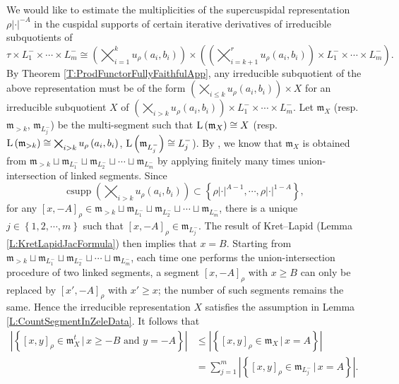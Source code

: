 \documentclass[11pt,letterpaper]{amsart}
\theoremstyle{plain}
\numberwithin{theorem}{section}
\numberwithin{equation}{subsection}
\theoremstyle{remark}
\newcommand{\csupp}{\operatorname{csupp}} %
\begin{document}
We would like to estimate the multiplicities of the supercuspidal representation $\rho|\cdot|^{-A}$ in the cuspidal supports of certain iterative derivatives of irreducible subquotients of
\[
    \tau\times L^-_1\times\cdots\times L^-_m\cong \left(\bigtimes_{i=1}^k u_\rho\left(a_i,b_i\right)\right) \times \left(\left(\bigtimes_{i=k+1}^r u_\rho\left(a_i,b_i\right)\right)\times L^-_1\times\cdots\times L^-_m\right).
\]
By Theorem \ref{T:ProdFunctorFullyFaithfulApp}, any irreducible subquotient of the above representation must be of the form $\left(\bigtimes_{i\leq k} u_\rho\left(a_i,b_i\right)\right)\times X$ for an irreducible subquotient $X$ of $\left(\bigtimes_{i>k} u_\rho\left(a_i,b_i\right)\right)\times L^-_1\times\cdots\times L^-_m$. Let $\mathfrak{m}_X$ (resp. $\mathfrak{m}_{>k}$, $\mathfrak{m}_{L^-_j}$) be the multi-segment such that ${\rm L}\left(\mathfrak{m}_X\right)\cong X$ (resp. ${\rm L}\left(\mathfrak{m}_{>k}\right)\cong \bigtimes_{i>k} u_\rho\left(a_i,b_i\right)$, ${\rm L}\left(\mathfrak{m}_{L^-_j}\right)\cong L^-_j$). By \cite[Thm. 7.1]{ZeleII}, we know that $\mathfrak{m}_X$ is obtained from $\mathfrak{m}_{>k}\sqcup\mathfrak{m}_{L^-_1}\sqcup\mathfrak{m}_{L^-_2}\sqcup\cdots\sqcup\mathfrak{m}_{L^-_m}$ by applying finitely many times union-intersection of linked segments. Since
\[
    \csupp\left(\bigtimes_{i>k} u_\rho\left(a_i,b_i\right)\right)\subset\left\{\rho|\cdot|^{A-1},\cdots,\rho|\cdot|^{1-A}\right\},
\]
for any $\left[x,-A\right]_\rho\in\mathfrak{m}_{>k}\sqcup\mathfrak{m}_{L^-_1}\sqcup\mathfrak{m}_{L^-_2}\sqcup\cdots\sqcup\mathfrak{m}_{L^-_m}$, there is a unique $j\in\left\{1,2,\cdots,m\right\}$ such that $\left[x,-A\right]_\rho\in\mathfrak{m}_{L^-_j}$. The result of Kret--Lapid (Lemma \ref{L:KretLapidJacFormula}) then implies that $x=B$. Starting from $\mathfrak{m}_{>k}\sqcup\mathfrak{m}_{L^-_1}\sqcup\mathfrak{m}_{L^-_2}\sqcup\cdots\sqcup\mathfrak{m}_{L^-_m}$, each time one performs the union-intersection procedure of two linked segments, a segment $\left[x,-A\right]_\rho$ with $x\geq B$ can only be replaced by $\left[x',-A\right]_\rho$ with $x'\geq x$; the number of such segments remains the same. Hence the irreducible representation $X$ satisfies the assumption in Lemma \ref{L:CountSegmentInZeleData}. It follows that
\begin{align*}
    \left|\left\{\left[x,y\right]_\rho\in\mathfrak{m}_X^t\,\big|\,x\geq -B \text{ and } y=-A\right\}\right| &\leq \left|\left\{\left[x,y\right]_\rho\in\mathfrak{m}_X\,\big|\,x=A\right\}\right|\\
    & = \sum_{j=1}^m\left|\left\{\left[x,y\right]_\rho\in\mathfrak{m}_{L^-_j}\,\big|\,x=A\right\}\right|.
\end{align*}
\end{document}
